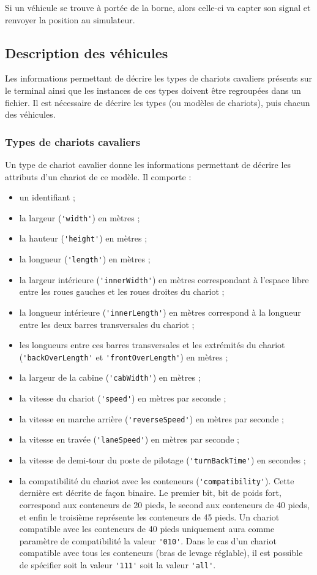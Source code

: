 Si un véhicule se trouve à portée de la borne, alors celle-ci va capter son signal et renvoyer la position au simulateur.

\subsection{Description des véhicules}\label{sec:description:vehicules}

Les informations permettant de décrire les types de chariots cavaliers présents sur le terminal ainsi que les instances de ces types doivent être regroupées dans un fichier. Il est nécessaire de décrire les types (ou modèles de chariots), puis chacun des véhicules.

\subsubsection{Types de chariots cavaliers}

Un type de chariot cavalier donne les informations permettant de décrire les attributs d'un chariot de ce modèle. Il comporte :
\begin{itemize}
\item un identifiant ;
\item la largeur (\verb!'width'!) en mètres ;
\item la hauteur (\verb!'height'!) en mètres ;
\item la longueur (\verb!'length'!) en mètres ;
\item la largeur intérieure (\verb!'innerWidth'!) en mètres correspondant à l'espace libre entre les roues gauches et les roues droites du chariot ;
\item la longueur intérieure (\verb!'innerLength'!) en mètres correspond à la longueur entre les deux barres transversales du chariot ;
\item les longueurs entre ces barres transversales et les extrémités du chariot (\verb!'backOverLength'! et \verb!'frontOverLength'!) en mètres ;
\item la largeur de la cabine (\verb!'cabWidth'!) en mètres ;
\item la vitesse du chariot (\verb!'speed'!) en mètres par seconde ;
\item la vitesse en marche arrière (\verb!'reverseSpeed'!) en mètres par seconde ;
\item la vitesse en travée (\verb!'laneSpeed'!) en mètres par seconde ;
\item la vitesse de demi-tour du poste de pilotage (\verb!'turnBackTime'!) en secondes ;
\item la compatibilité du chariot avec les conteneurs (\verb!'compatibility'!). Cette dernière est décrite de façon binaire. Le premier bit, bit de poids fort, correspond aux conteneurs de 20 pieds, le second aux conteneurs de 40 pieds, et enfin le troisième représente les conteneurs de 45 pieds. Un chariot compatible avec les conteneurs de 40 pieds uniquement aura comme paramètre de compatibilité la valeur \verb!'010'!. Dans le cas d'un chariot compatible avec tous les conteneurs (bras de levage réglable), il est possible de spécifier soit la valeur \verb!'111'! soit la valeur \verb!'all'!.
\end{itemize}

